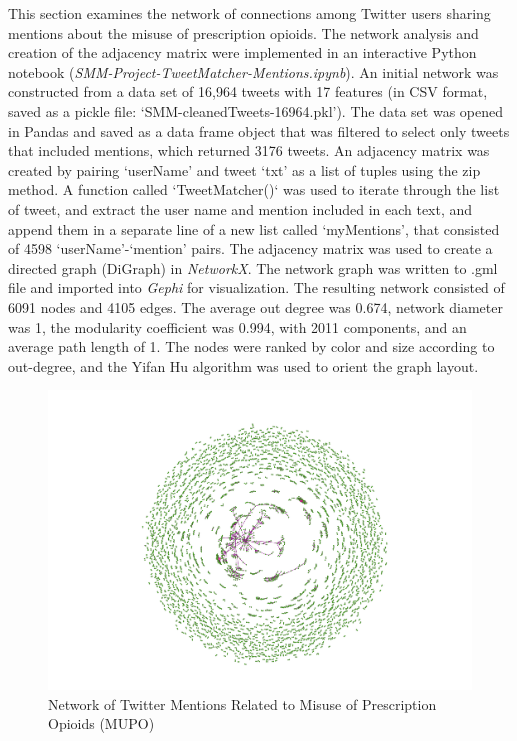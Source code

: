 \documentclass[sigconf]{acmart}
\begin{document}
This section examines the network of connections among Twitter users sharing 
mentions about the misuse of prescription opioids. The network analysis and 
creation of the adjacency matrix were implemented in an interactive Python 
notebook (\emph{SMM-Project-TweetMatcher-Mentions.ipynb}). An initial network 
was constructed from a data set of 16,964 tweets with 17 features (in CSV 
format, saved as a pickle file: `SMM-cleanedTweets-16964.pkl'). The data set 
was opened in Pandas and saved as a data frame object that was filtered to 
select only tweets that included mentions, which returned 3176 tweets. An 
adjacency matrix was created by pairing `userName' and tweet `txt' as a list 
of tuples using the zip method. A function called `TweetMatcher()` was used 
to iterate through the list of tweet, and extract the user name and mention 
included in each text, and append them in a separate line of a new list called 
‘myMentions’, that consisted of 4598 `userName'-`mention' pairs. The adjacency 
matrix was used to create a directed graph (DiGraph) in \emph{NetworkX}. 
The network graph was written to .gml file and imported into \emph{Gephi} for 
visualization. The resulting network consisted of 6091 nodes and 4105 edges. 
The average out degree was 0.674, network diameter was 1, the modularity 
coefficient was 0.994, with 2011 components, and an average path length of 1. 
The nodes were ranked by color and size according to out-degree, and the 
Yifan Hu algorithm was used to orient the graph layout.

\begin{figure}[!ht]
  \centering\includegraphics[width=\columnwidth]{images/Figure7.pdf}
  \caption{Network of Twitter Mentions Related to Misuse of Prescription 
  Opioids (MUPO)}
  \label{f:Figure7}
\end{figure}
\end{document}
